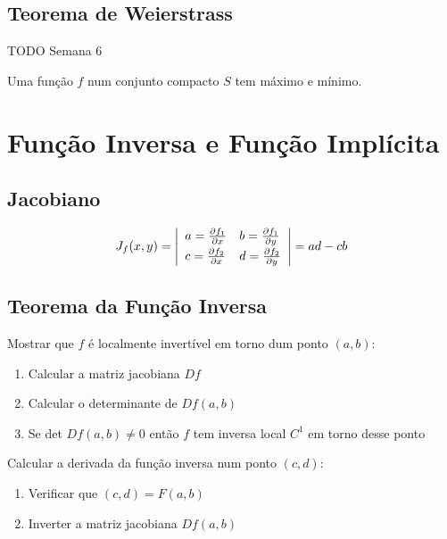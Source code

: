 \documentclass[11pt, a4paper]{article}
\begin{document}
\subsection{Teorema de Weierstrass}

TODO Semana 6

Uma função $f$ num conjunto compacto $S$ tem máximo e mínimo.

\section{Função Inversa e Função Implícita}

\subsection*{Jacobiano}

\begin{equation*}
    J_f(x, y) =
    \left\lvert
    \begin{array}{l l}
        a = \frac{\partial f_1}{\partial x} &
        b = \frac{\partial f_1}{\partial y} \vspace{2pt} \\
        c = \frac{\partial f_2}{\partial x} &
        d = \frac{\partial f_2}{\partial y}
    \end{array}
    \right\rvert =
    ad - cb
\end{equation*}

\subsection{Teorema da Função Inversa}

Mostrar que $f$ é localmente invertível em torno dum ponto $(a, b)$:

\begin{enumerate}
    \item Calcular a matriz jacobiana $Df$
    \item Calcular o determinante de $Df(a, b)$
    \item Se det $Df(a, b) \ne 0$ então $f$ tem inversa local $C^1$ em torno desse ponto
\end{enumerate}

Calcular a derivada da função inversa num ponto $(c, d)$:

\begin{enumerate}
    \item Verificar que $(c, d) = F(a, b)$
    \item Inverter a matriz jacobiana $Df(a, b)$
\end{enumerate}
\end{document}
